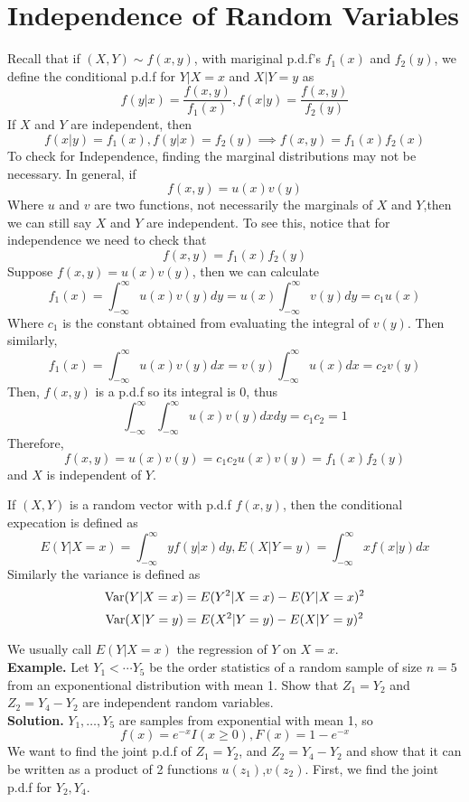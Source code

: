 \documentclass[openany]{report}
\begin{document}
    \section{Independence of Random Variables}
    Recall that if $(X,Y) \sim f(x,y)$, with mariginal p.d.f's $f_1(x)$ and $f_2(y)$, we define the conditional p.d.f for $Y|X = x$ and $X|Y = y$ as 
    \[f(y|x) = \frac{f(x,y)}{f_1(x)}, f(x|y) = \frac{f(x,y)}{f_2(y)}\]
    If $X$ and $Y$ are independent, then 
    \[f(x|y) = f_1(x), f(y|x) = f_2(y) \implies f(x,y) = f_1(x)f_2(x)\]
    To check for Independence, finding the marginal distributions may not be necessary. In general, if 
    \[f(x,y) = u(x)v(y)\]
    Where $u$ and $v$ are two functions, not necessarily the marginals of $X$ and $Y$,then we can still say $X$ and $Y$ are independent. To see this, notice that for independence we need to check that 
    \[f(x,y) = f_1(x)f_2(y)\]
    Suppose $f(x,y) = u(x)v(y)$, then we can calculate 
    \[f_1(x) = \int_{-\infty}^{\infty} u(x)v(y)dy = u(x)\int_{-\infty}^{\infty}v(y)dy = c_1u(x)\]
    Where $c_1$ is the constant obtained from evaluating the integral of $v(y)$. Then similarly,
    \[f_1(x) = \int_{-\infty}^{\infty} u(x)v(y)dx = v(y)\int_{-\infty}^{\infty}u(x)dx = c_2v(y)\]
    Then, $f(x,y)$ is a p.d.f so its integral is 0, thus 
    \[\int_{-\infty}^{\infty}\int_{-\infty}^{\infty}u(x)v(y)dxdy = c_1c_2 = 1\]
    Therefore,
    \[f(x,y) = u(x)v(y) = c_1c_2u(x)v(y) = f_1(x)f_2(y)\]
    and $X$ is independent of $Y$. 
    \begin{definition}
        If $(X,Y)$ is a random vector with p.d.f $f(x,y)$, then the conditional expecation is defined as 
        \[E(Y|X = x) = \int_{-\infty}^{\infty} yf(y|x)dy, E(X|Y = y) = \int_{-\infty}^{\infty} xf(x|y)dx\]
        Similarly the variance is defined as 
        \[\operatorname{Var}(Y|X = x) = E(Y^2|X = x) - E(Y|X = x)^2\]
        \[\operatorname{Var}(X|Y = y) = E(X^2|Y = y) - E(X|Y = y)^2\]
    \end{definition}
    We usually call $E(Y|X=x)$ the regression of $Y$ on $X = x$.\\[2ex]
    \textbf{Example.} Let $Y_1 < \cdots Y_5$ be the order statistics of a random sample of size $n=5$ from an exponentional distribution with mean 1. Show that $Z_1 = Y_2$ and $Z_2 = Y_4 - Y_2$ are independent random variables. \\[2ex]
    \textbf{Solution.} $Y_1,\ldots, Y_5$ are samples from exponential with mean 1, so 
    \[f(x) = e^{-x}I(x \geq 0), F(x) = 1 - e^{-x}\]
    We want to find the joint p.d.f of $Z_1 = Y_2$, and $Z_2 = Y_4-Y_2$ and show that it can be written as a product of 2 functions $u(z_1)$,$v(z_2)$. First, we find the joint p.d.f for $Y_2,Y_4$. 
\end{document}
